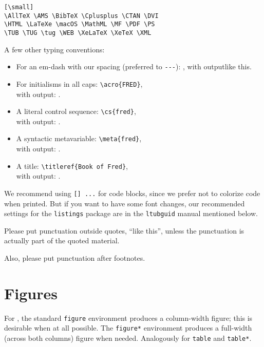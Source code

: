 \documentclass{ltugboat}
\begin{document}
\begin{verbatim}[\small]
\AllTeX \AMS \BibTeX \Cplusplus \CTAN \DVI
\HTML \LaTeXe \macOS \MathML \MF \PDF \PS
\TUB \TUG \tug \WEB \XeLaTeX \XeTeX \XML
\end{verbatim}

A few other typing conventions:

\begin{itemize}
\item For an em-dash with our spacing (preferred to \verb|---|):
, with output\Dash like this.

\item For initialisms in all caps:
\verb|\acro{FRED}|,\\ with output: .

\item A literal control sequence:
\verb|\cs{fred}|,\\ with output: .

\item A syntactic metavariable:
\verb|\meta{fred}|,\\ with output: .

\item A title:
\verb|\titleref{Book of Fred}|,\\ with output: .
\end{itemize}

We recommend using \texttt{[\small] ...}
 for code blocks, since we prefer not to
colorize code when printed. But if you want to have some font changes,
our recommended settings for the \texttt{listings} package are in the
\texttt{ltubguid} manual mentioned below.

Please put punctuation outside quotes, ``like this'', unless the
punctuation is actually part of the quoted material.

Also, please put punctuation after footnotes.

\section{Figures}

For \TUB, the standard \texttt{figure} environment produces a
column-width figure; this is desirable when at all possible. The
\texttt{figure*} environment produces a full-width (across both columns)
figure when needed. Analogously for \texttt{table} and \texttt{table*}.
\end{document}

